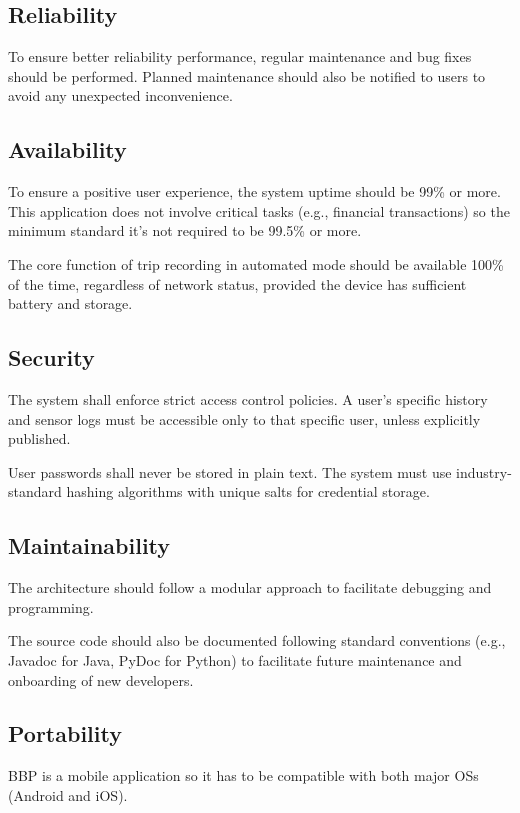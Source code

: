 \subsection{Reliability}

To ensure better reliability performance, regular maintenance and bug fixes should be performed. Planned maintenance should also be notified to users to avoid any unexpected inconvenience.

\subsection{Availability}

To ensure a positive user experience, the system uptime should be 99\% or more. This application does not involve critical tasks (e.g., financial transactions) so the minimum standard it's not required to be 99.5\% or more.

The core function of trip recording in automated mode should be available 100\% of the time, regardless of network status, provided the device has sufficient battery and storage.

\subsection{Security}

The system shall enforce strict access control policies. A user's specific history and sensor logs must be accessible only to that specific user, unless explicitly published.

User passwords shall never be stored in plain text. The system must use industry-standard hashing algorithms with unique salts for credential storage.

\subsection{Maintainability}

The architecture should follow a modular approach to facilitate debugging and programming.

The source code should also be documented following standard conventions (e.g., Javadoc for Java, PyDoc for Python) to facilitate future maintenance and onboarding of new developers.

\subsection{Portability}

BBP is a mobile application so it has to be compatible with both major OSs (Android and iOS).

